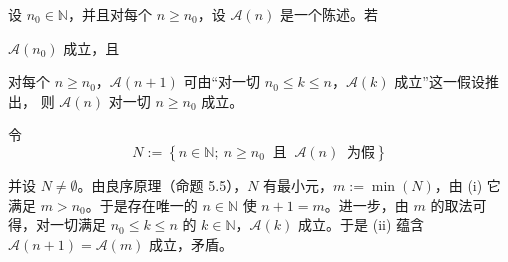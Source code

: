 \begin{proposition}

设 $ n_0 \in \mathbb{N} $，并且对每个 $ n \geq n_0 $，设 $ \mathcal{A}(n) $ 是一个陈述。若

\begin{subitems}
\item

$ \mathcal{A}(n_{0}) $ 成立，且

\item

对每个 $ n \geq n_0 $，$ \mathcal{A}(n+1) $ 可由“对一切 $ n_0 \leq k \leq n $，$ \mathcal{A}(k) $ 成立”这一假设推出，
则 $ \mathcal{A}(n) $ 对一切 $ n \geq n_0 $ 成立。

\proofhead
令
\[
N:=\left\{n \in \mathbb{N} ; ~ n \geq n_{0} ~\text{ 且 } ~ \mathcal{A}(n) ~\text{ 为假}\right\}
\]

并设 $N \neq \emptyset$。由良序原理（命题 5.5），$N$ 有最小元，$m := \min(N)$，由 (i) 它满足 $m > n_0$。于是存在唯一的 $n \in \mathbb{N}$ 使 $n + 1 = m$。进一步，由 $m$ 的取法可得，对一切满足 $n_0 \leq k \leq n$ 的 $k \in \mathbb{N}$，$\mathcal{A}(k)$ 成立。于是 (ii) 蕴含 $\mathcal{A}(n + 1) = \mathcal{A}(m)$ 成立，矛盾。

\end{subitems}

\end{proposition}

